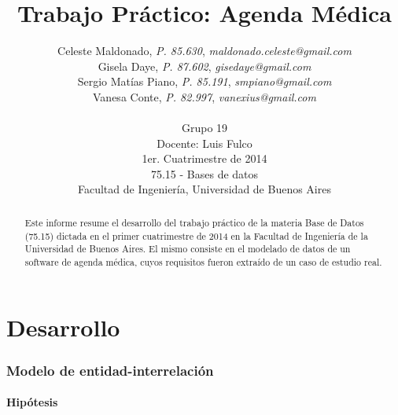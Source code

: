 \documentclass[a4paper,11pt]{article}
\title{\textbf{Trabajo Práctico: Agenda Médica}}
\author{
  Celeste Maldonado,	\textit{P. 85.630},	\textit{maldonado.celeste@gmail.com}	\\
  Gisela Daye,		\textit{P. 87.602},	\textit{gisedaye@gmail.com}		\\
  Sergio Matías Piano,	\textit{P. 85.191},	\textit{smpiano@gmail.com}		\\
  Vanesa Conte,		\textit{P. 82.997},	\textit{vanexius@gmail.com}		\\
  \\
  \normalsize{Grupo 19}							\\
  \normalsize{Docente: Luis Fulco}					\\
  \normalsize{1er. Cuatrimestre de 2014}                           	\\
  \normalsize{75.15 - Bases de datos}                              	\\
  \normalsize{Facultad de Ingeniería, Universidad de Buenos Aires}
}
\date{}
\begin{document}
\thispagestyle{empty}

\null  %
\nointerlineskip  %
\vfill
\let\snewpage \newpage
\let\newpage \relax

\maketitle

\begin{abstract}

  Este informe resume el desarrollo del trabajo práctico de la materia Base
  de Datos (75.15) dictada en el primer cuatrimestre de 2014 en la Facultad de
  Ingeniería de la Universidad de Buenos Aires. El mismo consiste en el
  modelado de datos de un software de agenda médica,
  cuyos requisitos fueron extraído de un caso de estudio real.

\end{abstract}

\let \newpage \snewpage
\vfill 
\break %
\clearpage

\tableofcontents
\clearpage


\part{Desarrollo}


\section{Modelo de entidad-interrelación} \label{sec:der}

\subsection{Hipótesis}
\end{document}
